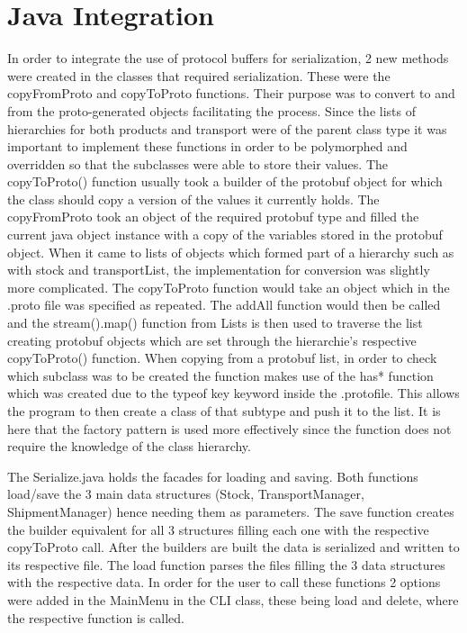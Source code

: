 \documentclass[12pt, a4paper]{report}
\begin{document}
\section{Java Integration}
In order to integrate the use of protocol buffers for serialization, 2 new methods were created in the classes that required serialization. These were the copyFromProto and copyToProto functions. Their purpose was to convert to and from the proto-generated objects facilitating the process. Since the lists of hierarchies for both products and transport were of the parent class type it was important to implement these functions in order to be polymorphed and overridden so that the subclasses were able to store their values. The copyToProto() function usually took a builder of the protobuf object for which the class should copy a version of the values it currently holds. The copyFromProto took an object of the required protobuf type and filled the current java object instance with a copy of the variables stored in the protobuf object. When it came to lists of objects which formed part of a hierarchy such as with stock and transportList, the implementation for conversion was slightly more complicated. The copyToProto function would take an object which in the .proto file was specified as repeated. The addAll function would then be called and the stream().map() function from Lists is then used to traverse the list creating protobuf objects which are set through the hierarchie's respective copyToProto() function. When copying from a protobuf list, in order to check which subclass was to be created the function makes use of the has* function which was created due to the typeof key keyword inside the .protofile. This allows the program to then create a class of that subtype and push it to the list. It is here that the factory pattern is used more effectively since the function does not require the knowledge of the class hierarchy. 

The Serialize.java holds the facades for loading and saving. Both functions load/save the 3 main data structures (Stock, TransportManager, ShipmentManager) hence needing them as parameters. The save function creates the builder equivalent for all 3 structures filling each one with the respective copyToProto call. After the builders are built the data is serialized and written to its respective file. The load function parses the files filling the 3 data structures with the respective data. In order for the user to call these functions 2 options were added in the MainMenu in the CLI class, these being load and delete, where the respective function is called.
\end{document}
